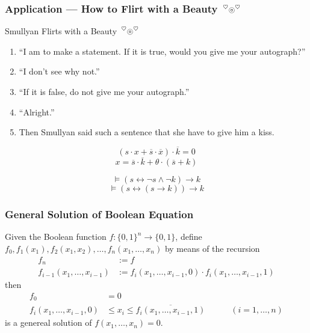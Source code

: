 \documentclass[UTF8,aspectratio=43,11pt,colorlinks,compress,openany]{beamer}%
\begin{document}
\begin{frame}\frametitle{Application --- How to Flirt with a Beauty $\sideset{^\heartsuit}{^\heartsuit}{\operatorname{\circledcirc}}$}
	\begin{block}{Smullyan Flirts with a Beauty $\sideset{^\heartsuit}{^\heartsuit}{\operatorname{\circledcirc}}$}
	\begin{enumerate}\small
		\item ``I am to make a statement. If it is true, would you give me your autograph?''
		\item ``I don't see why not.''
		\item ``If it is false, do not give me your autograph.''
		\item ``Alright.''
		\item Then Smullyan said such a sentence that she have to give him a kiss.
	\end{enumerate}
	\end{block}\pause
	\begin{solution}
		\[\left(s\cdot x+\overline{s}\cdot\overline{x}\right)\cdot\overline{k}=0\]
		\[x=\overline{s}\cdot\overline{k}+\theta\cdot(\overline{s}+k)\]
	\end{solution}\vspace{-2ex}
	\[\vDash(s\leftrightarrow\neg s\wedge\neg k)\to k\]
	\[\vDash(s\leftrightarrow(s\to k))\to k\]
\end{frame}

\begin{frame}\frametitle{General Solution of Boolean Equation}
	\begin{theorem}
		Given the Boolean function $f:\{0,1\}^n\to\{0,1\}$, define $f_0, f_1(x_1), f_2(x_1,x_2),\dots, f_n(x_1,\dots,x_n)$ by means of the recursion
		\begin{align*}
		f_n&:=f\\
		f_{i-1}(x_1,\dots,x_{i-1})&:=f_i(x_1,\dots,x_{i-1},0)\cdot f_i(x_1,\dots,x_{i-1},1)
		\end{align*}
		then
		\begin{align*}
		f_0&=0\\
		f_i(x_1,\dots,x_{i-1},0)&\leq x_i\leq\overline{f_i(x_1,\dots,x_{i-1},1)}\qquad\quad (i=1,\dots,n)
		\end{align*}
		is a genereal solution of $f(x_1,\dots,x_n)=0$.
	\end{theorem}
\end{frame}
\end{document}
